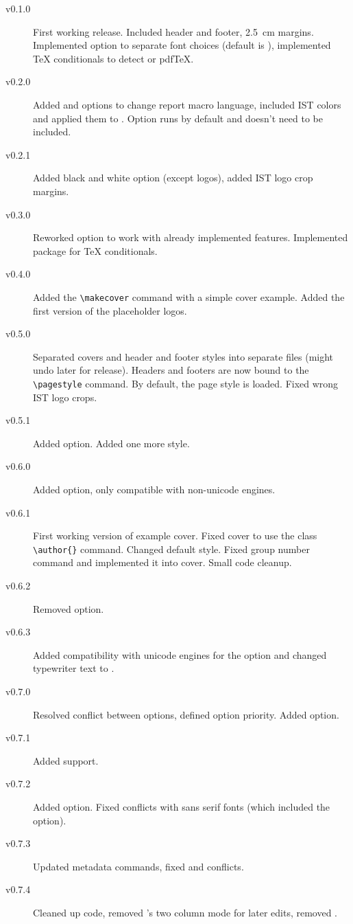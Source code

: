 \documentclass[palatino,english]{ist-report}
\begin{document}
\begin{description}
	\item [v0.1.0] First working release. Included header and footer, \SI{2.5}{\centi\meter} margins. Implemented  option to separate font choices (default is ), implemented \TeX{} conditionals to detect \XeTeX{} or pdf\TeX{}.
	\item [v0.2.0] Added  and  options to change report macro language, included IST colors and applied them to . Option  runs by default and doesn't need to be included.
	\item [v0.2.1] Added black and white option (except logos), added IST logo crop margins.
	\item [v0.3.0] Reworked  option to work with already implemented features. Implemented  package for \TeX{} conditionals.
	\item [v0.4.0] Added the \verb|\makecover| command with a simple cover example. Added the first version of the placeholder logos.
	\item [v0.5.0] Separated covers and header and footer styles into separate files (might undo later for release). Headers and footers are now bound to the \verb|\pagestyle| command. By default, the  page style is loaded. Fixed wrong IST logo crops.
	\item [v0.5.1] Added  option. Added one more style.
	\item [v0.6.0] Added  option, only compatible with non-unicode engines.
	\item [v0.6.1] First working version of example cover. Fixed cover to use the  class \verb|\author{}| command. Changed default style. Fixed group number command and implemented it into cover. Small code cleanup.
	\item [v0.6.2] Removed  option.
	\item [v0.6.3] Added compatibility with unicode engines for the  option and changed typewriter text to .
	\item [v0.7.0] Resolved conflict between options, defined option priority. Added  option.
	\item [v0.7.1] Added \LuaLaTeX{} support.
	\item [v0.7.2] Added  option. Fixed conflicts with sans serif fonts (which included the  option).
	\item [v0.7.3] Updated metadata commands, fixed  and  conflicts.
	\item [v0.7.4] Cleaned up code, removed 's two column mode for later edits, removed .
\end{description}

\printbibliography
\end{document}
